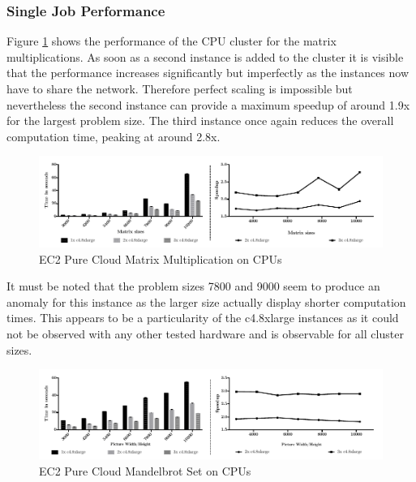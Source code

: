 \subsubsection*{Single Job Performance}

Figure \ref{img:ec2_cpu_matrix_multiplication} shows the performance of the CPU cluster for the matrix multiplications. As soon as a second instance is added to the cluster it is visible that the performance increases significantly but imperfectly as the instances now have to share the network. Therefore perfect scaling is impossible but nevertheless the second instance can provide a maximum speedup of around 1.9x for the largest problem size. The third instance once again reduces the overall computation time, peaking at around 2.8x.

\begin{figure}[!htb]
	\includegraphics[width=1.0\textwidth]{images/ec2_cpu_matrix_multiplication.pdf}
	\centering
	\caption{EC2 Pure Cloud Matrix Multiplication on CPUs}
	\label{img:ec2_cpu_matrix_multiplication}
\end{figure}

It must be noted that the problem sizes 7800 and 9000 seem to produce an anomaly for this instance as the larger size actually display shorter computation times. This appears to be a particularity of the c4.8xlarge instances as it could not be observed with any other tested hardware and is observable for all cluster sizes.


\begin{figure}[!htb]
	\includegraphics[width=1.0\textwidth]{images/ec2_cpu_mandelbrot.pdf}
	\centering
	\caption{EC2 Pure Cloud Mandelbrot Set on CPUs}
	\label{img:ec2_cpu_mandelbrot}
\end{figure}

